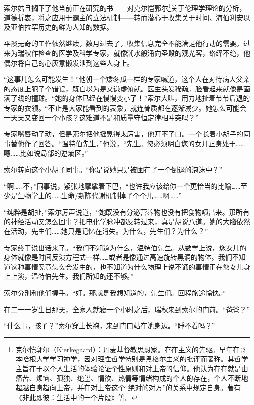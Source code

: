 \documentclass[AutoFakeBold=true]{book}
\begin{document}
索尔姑且搁下了他当前正在研究的书——对克尔恺郭尔\footnote{克尔恺郭尔（Kierkegaard）：丹麦基督教思想家。存在主义的先驱。早年在哥本哈根大学学习神学，因对理性哲学特别是黑格尔主义的批评而著称。其哲学主旨在于以个人生活的体验论证个性原则和对上帝的信仰。他认为存在就是由痛苦、烦恼、孤独、绝望、情欲、热情等情绪构成的个人的存在，个人不断地超越自身趋向上帝，并在对上帝这个``绝对的对方''的关系中规定自身。著有《非此即彼：生活中的一个片段》等。}关于伦理学理论的分析，道德折衷，将之应用于霸主的立法机制——转而潜心于收集关于时间、海伯利安以及亚伯拉罕历史的鲜为人知的数据。

平淡无奇的工作依然继续，数月过去了，收集信息完全不能满足他行动的需要。过来为瑞秋作检查的医学及科学专家，就像潮水般涌向圣殿的观光客，络绎不绝，他偶尔将自己的心灰意懒发泄到这些人身上。

``这事儿怎么可能发生！''他朝一个矮冬瓜一样的专家喊道，这个人在对待病人父亲的态度上犯了个错误，既自以为是又谦虚俯就。医生头发稀疏，脸看起来就像是画满了线的撞球。``她的身体已经在慢慢变小了！''索尔大叫，用力地扯着节节后退的专家的衣领。``不止是大家能看到的表象，就连骨质都在逐渐减少。她怎么可能会一天天又变回一个小孩？这难道不是和质量守恒定律相冲突吗？''

专家嘴唇动了动，但是索尔把他摇晃得太厉害，他开不了口。一个长着小胡子的同事替他作了回答。``温特伯先生，''他说，``先生。您必须明白您的女儿正身处于……嗯……比如说局部的逆熵区。''

索尔转向这个小胡子同事。``你是说她只是被困在了一个倒退的泡沫中？''

``啊……不，''同事说，紧张地摩挲着下巴，``也许我应该给你一个更恰当的比喻……至少是生物学上的……生命/新陈代谢机制掉了个个儿……啊……''

``纯粹是胡扯，''索尔厉声说道，``她既没有分泌营养物也没有把食物喷出来。那所有的神经活动又怎么回事？把电化学脉冲都反转过来，真是胡说八道。她的大脑依然在活动，先生们……她只是记忆在消失。为什么，先生们？为什么？''

专家终于说出话来了。``我们不知道为什么，温特伯先生。从数学上说，您女儿的身体就像是时间反演方程式一样……或者是像通过高速旋转黑洞的物体。我们不知道这种事情究竟怎么会发生的，也不知道为什么物理上说不通的事情正在您女儿身上上演，温特伯先生。我们所知的还不够。''

索尔分别和他们握手。``好。那就是我想知道的，先生们。回程旅途愉快。''

\vspace*{1em}

在二十一岁生日那天，全家人就寝一个小时之后，瑞秋来到索尔的门前。``爸爸？''

``什么事，孩子？''索尔穿上长袍，来到门口站在她身边。``睡不着吗？''
\end{document}
